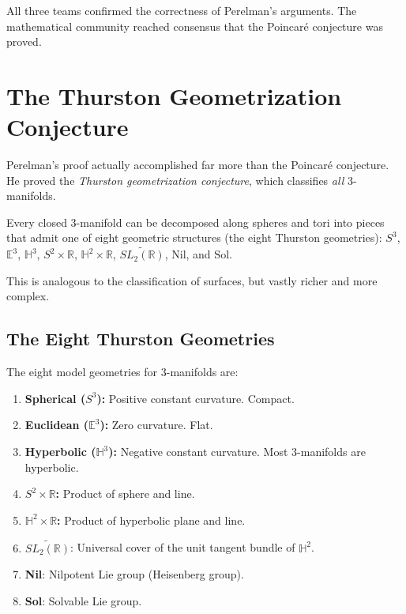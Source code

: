 All three teams confirmed the correctness of Perelman's arguments. The mathematical community reached consensus that the Poincar\'{e} conjecture was proved.

\section{The Thurston Geometrization Conjecture}

Perelman's proof actually accomplished far more than the Poincar\'{e} conjecture. He proved the \textit{Thurston geometrization conjecture}, which classifies \textit{all} 3-manifolds.

\begin{theorem}
Every closed 3-manifold can be decomposed along spheres and tori into pieces that admit one of eight geometric structures (the eight Thurston geometries): $S^3$, $\mathbb{E}^3$, $\mathbb{H}^3$, $S^2 \times \mathbb{R}$, $\mathbb{H}^2 \times \mathbb{R}$, $\widetilde{SL_2(\mathbb{R})}$, $\mathrm{Nil}$, and $\mathrm{Sol}$.
\end{theorem}

This is analogous to the classification of surfaces, but vastly richer and more complex.

\subsection{The Eight Thurston Geometries}

The eight model geometries for 3-manifolds are:
\begin{enumerate}
  \item \textbf{Spherical ($S^3$):} Positive constant curvature. Compact.
  \item \textbf{Euclidean ($\mathbb{E}^3$):} Zero curvature. Flat.
  \item \textbf{Hyperbolic ($\mathbb{H}^3$):} Negative constant curvature. Most 3-manifolds are hyperbolic.
  \item \textbf{$S^2 \times \mathbb{R}$:} Product of sphere and line.
  \item \textbf{$\mathbb{H}^2 \times \mathbb{R}$:} Product of hyperbolic plane and line.
  \item \textbf{$\widetilde{SL_2(\mathbb{R})}$}: Universal cover of the unit tangent bundle of $\mathbb{H}^2$.
  \item \textbf{Nil}: Nilpotent Lie group (Heisenberg group).
  \item \textbf{Sol}: Solvable Lie group.
\end{enumerate}

